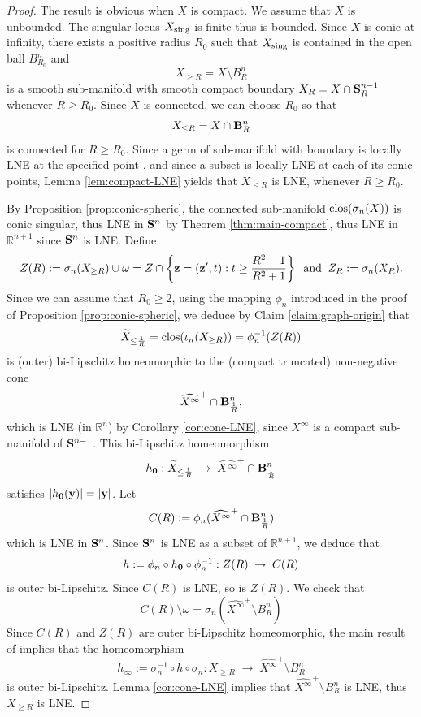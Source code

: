 \documentclass[11pt]{amsart}
\newcommand{\field}[1]{\mathbb{#1}}
\newcommand{\R}{\field{R}}
\newcommand{\wh}[1]{\widehat{#1}}
\newcommand{\wt}[1]{\widetilde{#1}}
\newcommand{\bbo}{{\bf 0}}
\newcommand{\bB}{{\bf B}}
\newcommand{\bS}{{\bf S}}
\newcommand{\by}{{\bf y}}
\newcommand{\bz}{{\bf z}}
\newcommand{\clos}{{\rm clos}}
\newcommand{\gR}{{\geq R}}
\newcommand{\lR}{{\leq R}}
\newcommand{\omg}{\omega}
\newcommand{\Rn}{{\R^n}}
\newcommand{\sing}{{\rm sing}}
\newcommand{\sgm}{\sigma}
\numberwithin{equation}{section}
\numberwithin{equation}{section}
\begin{document}
	\begin{proof}
		The result is obvious when $X$ is compact. We assume that $X$ is 
		unbounded. The singular locus $X_\sing$ is finite thus is bounded. 
		Since $X$ is conic at infinity, there exists a positive radius $R_0$ such that $X_\sing$ is contained in the open ball $B_{R_0}^n$ and 
		$$
		X_\gR = X \setminus B_R^n 
		$$
		is a smooth sub-manifold with smooth compact boundary
		$X_R = X \cap \bS_R^{n-1}$ whenever $R\geq R_0$. Since $X$ is 
		connected, we can choose $R_0$ so that 
		$$
		X_\lR = X \cap \bB_R^n
		$$
		is connected for $R\geq R_0$.
		Since a germ of sub-manifold with boundary is locally LNE at the specified 
		point \cite[Corollary 2.7]{CoGrMi1}, and since a subset is locally LNE at each of its conic points, Lemma \ref{lem:compact-LNE}
		yields that $X_\lR$ is LNE, whenever $R\geq R_0$.
		
		By Proposition \ref{prop:conic-spheric}, the connected sub-manifold 
		$\clos(\sgm_n(X))$ is conic singular, thus LNE in $\bS^n$ by Theorem 
		\ref{thm:main-compact}, thus LNE in $\R^{n+1}$ since $\bS^n$ is LNE.
		Define  
		$$
		Z(R) := \sgm_n(X_\gR) \cup \omg = Z \cap \left\{\bz =(\bz',t) : t \geq 
		\frac{R^2-1}{R^2+1} \right\} \;\; {\rm and} 
		\;\; Z_R := \sgm_n(X_R).
		$$
		Since we can assume that $R_0\geq 2$, using the mapping 
		$\phi_n$
		introduced in the proof of Proposition \ref{prop:conic-spheric},
		we deduce by Claim \ref{claim:graph-origin} that 
		$$
		\wt{X}_{\leq \frac{1}{R}} = \clos(\iota_n(X_\gR)) = \phi_n^{-1}(Z(R)) 
		$$
		is (outer) bi-Lipschitz homeomorphic to the (compact truncated) non-negative 
		cone
		$$
		\wh{X^\infty}^+\cap \bB_\frac{1}{R}^n,
		$$
		which is LNE (in $\Rn$) by Corollary \ref{cor:cone-LNE}, since $X^\infty$
		is a compact sub-manifold of $\bS^{n-1}$. This bi-Lipschitz homeomorphism
		$$
		h_\bbo :\wt{X}_{\leq \frac{1}{R}} \; \to \; \wh{X^\infty}^+\cap 
        \bB_\frac{1}{R}^n
		$$
		satisfies $|h_\bbo(\by)| = |\by|$. Let 
		$$
		C(R) := \phi_n (\wh{X^\infty}^+\cap \bB_\frac{1}{R}^n)
		$$
		which is LNE in $\bS^n$. 
		Since $\bS^n$ is LNE as a subset of $\R^{n+1}$, we deduce that 
		$$
		h:= \phi_n \circ h_\bbo \circ \phi_n^{-1} : Z(R) \; \to \; C(R)
		$$
		is outer bi-Lipschitz. Since $C(R)$ is LNE, so is $Z(R)$.
		We check that 
		$$
		C(R) \setminus \omg = \sgm_n (\wh{X^\infty}^+\setminus B_R^n) 
		$$
		Since $C(R)$ and $Z(R)$ are outer bi-Lipschitz homeomorphic, 
		the main result of \cite{GrOl} implies that the homeomorphism
		$$
		h_\infty := \sgm_n^{-1} \circ h \circ \sgm_n : X_\gR \; \to \; 
		\wh{X^\infty}^+  \setminus B_R^n
		$$
		is outer bi-Lipschitz. 
		Lemma \ref{cor:cone-LNE} implies 
		that $\wh{X^\infty}^+  \setminus B_R^n$ is LNE, thus $X_\gR$ is LNE.
		

\end{proof}
\end{document}
